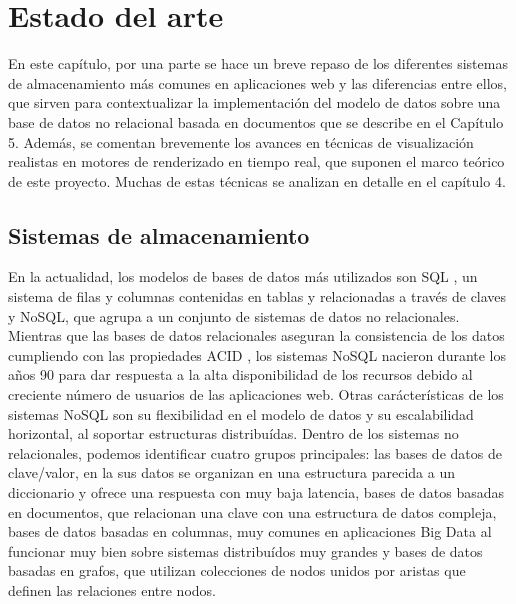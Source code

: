\chapter{Estado del arte}
En este cap\'itulo, por una parte se hace un breve repaso de los diferentes sistemas de almacenamiento m\'as comunes en aplicaciones web
y las diferencias entre ellos, que sirven para contextualizar la implementaci\'on del modelo de datos sobre una base de datos no
relacional basada en documentos que se describe en el Cap\'itulo 5.
Adem\'as, se comentan brevemente los avances en t\'ecnicas de visualizaci\'on realistas en motores de renderizado en tiempo real, que suponen
el marco te\'orico de este proyecto. Muchas de estas t\'ecnicas se analizan en detalle en el cap\'itulo 4.


\section{Sistemas de almacenamiento}
En la actualidad, los modelos de bases de datos m\'as utilizados son SQL \autocite{sql}, un sistema de filas y columnas
contenidas en tablas y relacionadas a trav\'es de claves y NoSQL, que agrupa a un conjunto de sistemas de datos no relacionales.
Mientras que las bases de datos relacionales aseguran la consistencia de los datos cumpliendo con las propiedades ACID
\autocite{acid}, los sistemas NoSQL nacieron durante los a\~nos 90 para dar respuesta a la alta disponibilidad de los recursos debido al creciente
n\'umero de usuarios de las aplicaciones web. Otras car\'acter\'isticas de los sistemas NoSQL son su flexibilidad en el modelo de datos
y su escalabilidad horizontal, al soportar estructuras distribu\'idas. Dentro de los sistemas no relacionales, podemos identificar
cuatro grupos principales: las bases de datos de clave/valor, en la sus datos se organizan en una estructura parecida a un diccionario
y ofrece una respuesta con muy baja latencia, bases de datos basadas en documentos, que relacionan una clave con una estructura
de datos compleja, bases de datos basadas en columnas, muy comunes en aplicaciones Big Data al funcionar muy bien sobre sistemas
distribu\'idos muy grandes y bases de datos basadas en grafos, que utilizan colecciones de nodos unidos por aristas que definen
las relaciones entre nodos.

